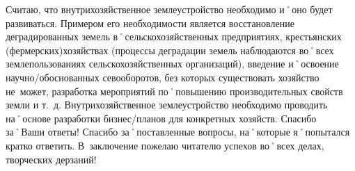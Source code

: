 \begin{drama}
	\michaelspeaks Считаю, что внутрихозяйственное землеустройство необходимо и˚оно будет развиваться. Примером его необходимости является восстановление деградированных земель в˚сельскохозяйственных предприятиях, крестьянских (фермерских)хозяйствах (процессы деградации земель наблюдаются во˚всех землепользованиях сельскохозяйственных организаций), введение и˚освоение научно\-/обоснованных севооборотов, без которых существовать хозяйство не~может, разработка мероприятий по˚повышению производительных свойств земли и т.~д. Внутрихозяйственное землеустройство необходимо проводить на˚основе разработки бизнес\-/планов для конкретных хозяйств.
	\maxspeaks Спасибо за˚Ваши ответы!
	\michaelspeaks Спасибо за˚поставленные вопросы, на˚которые я˚попытался кратко ответить. В~заключение пожелаю читателю успехов во˚всех делах, творческих дерзаний!

\end{drama}